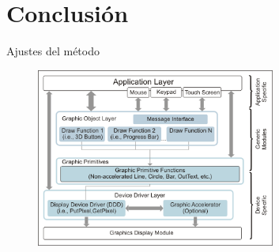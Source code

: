 \documentclass{beamer}
\begin{document}
\section{Conclusión}
\begin{frame}{Ajustes del método}
  \begin{figure}[h]
    \centering
    \includegraphics[width=0.7\textwidth]{img/method}
  \end{figure}

\end{frame}
\end{document}
